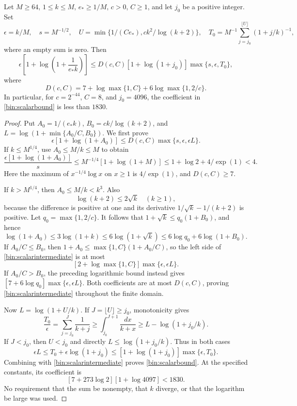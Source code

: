 \begin{lemma}
\label{bin:scalar}
Let $M\ge64$, $1\le k\le M$, $e_*\ge1/M$, $c>0$, $C\ge1$, and let $j_0$ be a positive integer. Set
\[
 \epsilon=k/M,\quad s=M^{-1/2},\quad
 U=\min\{1/(Ce_*),ck^2/\log(k+2)\},\quad
 T_0=M^{-1}\sum_{j=j_0}^{\lfloor U\rfloor}(1+j/k)^{-1},
\]
where an empty sum is zero. Then
\begin{equation}
 \epsilon\left[1+\log\left(1+\frac1{e_*k}\right)\right]
 \le D(c,C)[1+\log(1+j_0)]\max\{s,\epsilon,T_0\},
 \label{bin:scalarbound}
\end{equation}
where
\[
 D(c,C)=7+\log\max\{1,C\}+6\log\max\{1,2/c\}.
\]
In particular, for $c=2^{-44}$, $C=8$, and $j_0=4096$, the coefficient in \eqref{bin:scalarbound} is less than $1830$.
\end{lemma}
\begin{proof}
Put $A_0=1/(e_*k)$, $B_0=ck/\log(k+2)$, and
$L=\log(1+\min\{A_0/C,B_0\})$. We first prove
\begin{equation}
 \epsilon[1+\log(1+A_0)]
 \le D(c,C)\max\{s,\epsilon,\epsilon L\}.
 \label{bin:scalarintermediate}
\end{equation}
If $k\le M^{1/4}$, use $A_0\le M/k\le M$ to obtain
\[
 \frac{\epsilon[1+\log(1+A_0)]}{s}
 \le M^{-1/4}[1+\log(1+M)]
 \le1+\log2+4/\exp(1)<4.
\]
Here the maximum of $x^{-1/4}\log x$ on $x\ge1$ is $4/\exp(1)$, and $D(c,C)\ge7$.

If $k>M^{1/4}$, then $A_0\le M/k<k^3$. Also
\[
 \log(k+2)\le2\sqrt k\quad(k\ge1),
\]
because the difference is positive at one and its derivative $1/\sqrt k-1/(k+2)$ is positive. Let $q_0=\max\{1,2/c\}$. It follows that $1+\sqrt k\le q_0(1+B_0)$, and hence
\[
 \log(1+A_0)\le3\log(1+k)
 \le6\log(1+\sqrt k)
 \le6\log q_0+6\log(1+B_0).
\]
If $A_0/C\le B_0$, then $1+A_0\le\max\{1,C\}(1+A_0/C)$, so the left side of \eqref{bin:scalarintermediate} is at most
\[
 [2+\log\max\{1,C\}]\max\{\epsilon,\epsilon L\}.
\]
If $A_0/C>B_0$, the preceding logarithmic bound instead gives
$[7+6\log q_0]\max\{\epsilon,\epsilon L\}$. Both coefficients are at most $D(c,C)$, proving \eqref{bin:scalarintermediate} throughout the finite domain.

Now $L=\log(1+U/k)$. If $J=\lfloor U\rfloor\ge j_0$, monotonicity gives
\[
 \frac{T_0}{\epsilon}
 =\sum_{j=j_0}^{J}\frac1{k+j}
 \ge\int_{j_0}^{J+1}\frac{dx}{k+x}
 \ge L-\log(1+j_0/k).
\]
If $J<j_0$, then $U<j_0$ and directly $L\le\log(1+j_0/k)$. Thus in both cases
\[
 \epsilon L\le T_0+\epsilon\log(1+j_0)
 \le[1+\log(1+j_0)]\max\{\epsilon,T_0\}.
\]
Combining with \eqref{bin:scalarintermediate} proves \eqref{bin:scalarbound}. At the specified constants, its coefficient is
\[
 [7+273\log2][1+\log4097]<1830.
\]
No requirement that the sum be nonempty, that $k$ diverge, or that the logarithm be large was used.
\end{proof}

